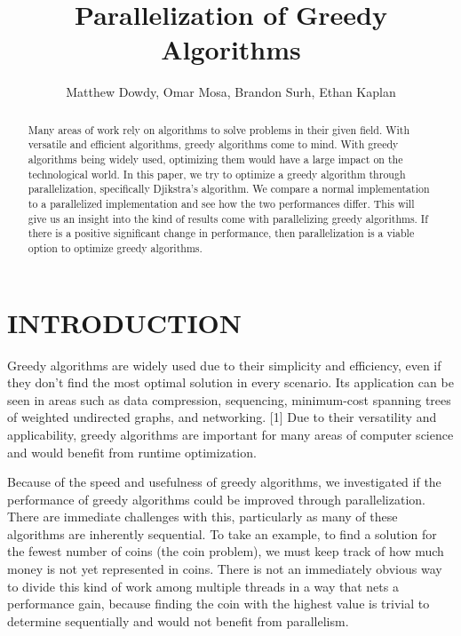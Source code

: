 \documentclass[letterpaper, 10 pt, conference]{ieeeconf}  %
\title{\LARGE \bf
Parallelization of Greedy Algorithms
}
\author{Matthew Dowdy, Omar Mosa, Brandon Surh, Ethan Kaplan}
\begin{document}
\maketitle
\thispagestyle{empty}
\pagestyle{empty}


\begin{abstract}

Many areas of work rely on algorithms to solve problems in their given field. With versatile and efficient algorithms, greedy algorithms come to mind. With greedy algorithms being widely used, optimizing them would have a large impact on the technological world. In this paper, we try to optimize a greedy algorithm through parallelization, specifically Djikstra’s algorithm. We compare a normal implementation to a parallelized implementation and see how the two performances differ. This will give us an insight into the kind of results come with parallelizing greedy algorithms. If there is a positive significant change in performance, then parallelization is a viable option to optimize greedy algorithms.

\end{abstract}


\section{INTRODUCTION}

Greedy algorithms are widely used due to their simplicity and efficiency, even if they don’t find the most optimal solution in every scenario. Its application can be seen in areas such as data compression, sequencing, minimum-cost spanning trees of weighted undirected graphs, and networking. [1] Due to their versatility and applicability, greedy algorithms are important for many areas of computer science and would benefit from runtime optimization. 

Because of the speed and usefulness of greedy algorithms, we investigated if the performance of greedy algorithms could be improved through parallelization. There are immediate challenges with this, particularly as many of these algorithms are inherently sequential. To take an example, to find a solution for the fewest number of coins (the coin problem), we must keep track of how much money is not yet represented in coins. There is not an immediately obvious way to divide this kind of work among multiple threads in a way that nets a performance gain, because finding the coin with the highest value is trivial to determine sequentially and would not benefit from parallelism.
\end{document}
